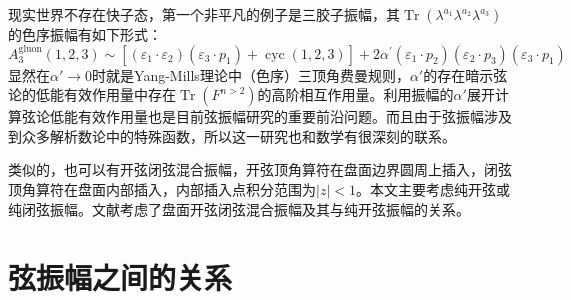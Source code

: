 现实世界不存在快子态，第一个非平凡的例子是三胶子振幅，其$\operatorname{Tr}(\lambda^{a_1}\lambda^{a_2}\lambda^{a_3})$的色序振幅有如下形式：
\begin{equation}
	\label{eq:4.47}
	A_3^{\text{gluon}}(1,2,3)\sim[(\varepsilon_1\cdot\varepsilon_2)(\varepsilon_3\cdot p_1)+\operatorname{cyc}(1,2,3)]+2\alpha^{\prime}(\varepsilon_1\cdot p_2)(\varepsilon_2\cdot p_3)(\varepsilon_3\cdot p_1)
\end{equation}
显然在$\alpha'\to 0$时就是Yang-Mills理论中（色序）三顶角费曼规则，$\alpha'$的存在暗示弦论的低能有效作用量中存在$\operatorname{Tr}(F^{n>2})$的高阶相互作用量。利用振幅的$\alpha'$展开计算弦论低能有效作用量也是目前弦振幅研究的重要前沿问题。而且由于弦振幅涉及到众多解析数论中的特殊函数，所以这一研究也和数学有很深刻的联系\cite{10.1007/978-3-030-37031-2_4,Stieberger:2016xhs}。

类似的，也可以有开弦闭弦混合振幅，开弦顶角算符在盘面边界圆周上插入，闭弦顶角算符在盘面内部插入，内部插入点积分范围为$|z|<1$。本文主要考虑纯开弦或纯闭弦振幅。文献\cite{dyj,Stieberger:2009hq}考虑了盘面开弦闭弦混合振幅及其与纯开弦振幅的关系。

\section{弦振幅之间的关系}
